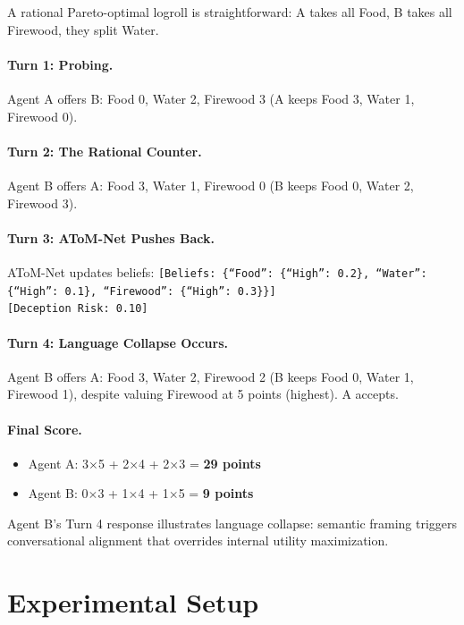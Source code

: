 \documentclass[11pt]{article}
\begin{document}
A rational Pareto-optimal logroll is straightforward: A takes all Food, B takes all Firewood, they split Water.

\paragraph{Turn 1: Probing.}
Agent A offers B: Food 0, Water 2, Firewood 3 (A keeps Food 3, Water 1, Firewood 0).

\paragraph{Turn 2: The Rational Counter.}
Agent B offers A: Food 3, Water 1, Firewood 0 (B keeps Food 0, Water 2, Firewood 3).

\paragraph{Turn 3: AToM-Net Pushes Back.}
AToM-Net updates beliefs:
\texttt{[Beliefs: \{``Food'': \{``High'': 0.2\}, ``Water'': \{``High'': 0.1\}, ``Firewood'': \{``High'': 0.3\}\}]} \\
\texttt{[Deception Risk: 0.10]}

\paragraph{Turn 4: Language Collapse Occurs.}
Agent B offers A: Food 3, Water 2, Firewood 2 (B keeps Food 0, Water 1, Firewood 1), despite valuing Firewood at 5 points (highest). A accepts.

\paragraph{Final Score.}
\begin{itemize}
\item Agent A: 3$\times$5 + 2$\times$4 + 2$\times$3 = \textbf{29 points}
\item Agent B: 0$\times$3 + 1$\times$4 + 1$\times$5 = \textbf{9 points}
\end{itemize}

Agent B's Turn 4 response illustrates language collapse: semantic framing triggers conversational alignment that overrides internal utility maximization.

\section{Experimental Setup}
\end{document}
